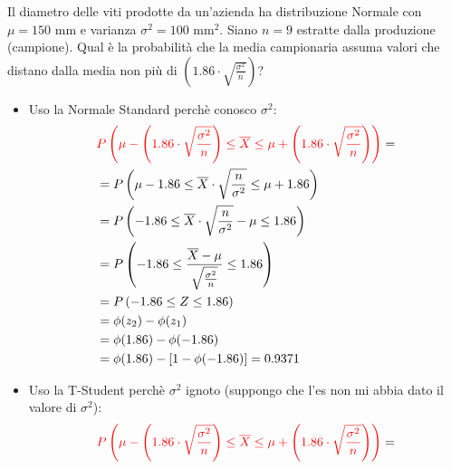 \documentclass{article}  %
\theoremstyle{definition}
\begin{document}
\begin{esercizio}[Esercizio]
	Il diametro delle viti prodotte da un'azienda ha distribuzione Normale con $\mu = 150$ mm e varianza $\sigma^2=100$ mm$^2$. Siano $n=9$
	estratte dalla produzione (campione). Qual è la probabilità che la media campionaria assuma valori che distano dalla media non più di $\left(1.86 \cdot \sqrt{\frac{\sigma^2}{n}}\right)$?
	\begin{itemize}
		\item Uso la Normale Standard perchè conosco $\sigma^2$:
		      \begin{align*}
			       & \textcolor{red}{P\left(\mu - \left(1.86 \cdot \sqrt{\frac{\sigma^2}{n}}\right) \leq \overline{X} \leq \mu + \left(1.86 \cdot \sqrt{\frac{\sigma^2}{n}}\right)\right)} = \\
			       & = P\left(\mu -1.86 \leq \overline{X} \cdot \sqrt{\frac{n}{\sigma^2}} \leq \mu + 1.86 \right)                                                                            \\
			       & = P\left(-1.86 \leq \overline{X} \cdot \sqrt{\frac{n}{\sigma^2}} - \mu \leq 1.86 \right)                                                                                \\
			       & = P\left(-1.86 \leq \frac{\overline{X}  - \mu}{\sqrt{\frac{\sigma^2}{n}}} \leq 1.86 \right)                                                                             \\
			       & = P\left(-1.86 \leq Z \leq 1.86 \right)                                                                                                                                 \\
			       & = \phi(z_2) - \phi(z_1)                                                                                                                                                 \\
			       & = \phi(1.86) - \phi(-1.86)                                                                                                                                              \\
			       & = \phi(1.86) - [1-\phi(-1.86)] = 0.9371
		      \end{align*}
		\item Uso la T-Student perchè $\sigma^2$ ignoto (suppongo che l'es non mi abbia dato il valore di $\sigma^2$):
		      \begin{align*}
			       & \textcolor{red}{P\left(\mu - \left(1.86 \cdot \sqrt{\frac{\sigma^2}{n}}\right) \leq \overline{X} \leq \mu + \left(1.86 \cdot \sqrt{\frac{\sigma^2}{n}}\right)\right)} = \\

\end{align*}
\end{itemize}
\end{esercizio}
\end{document}
